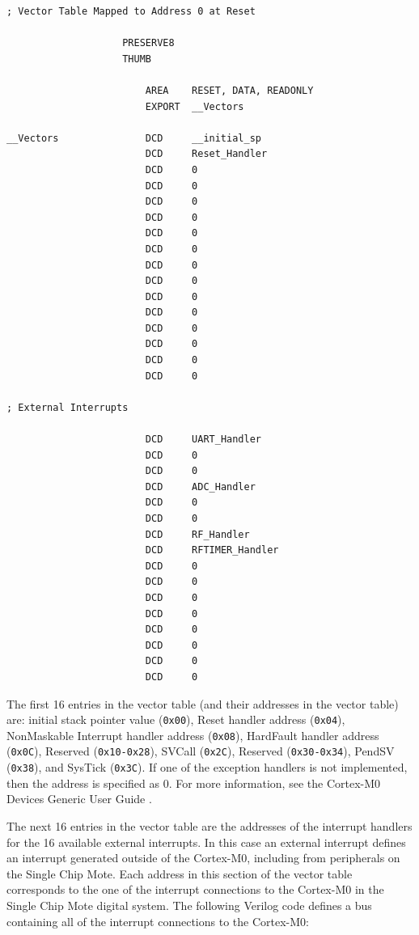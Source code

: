\begin{lstlisting}
; Vector Table Mapped to Address 0 at Reset

                    PRESERVE8
                    THUMB

                        AREA    RESET, DATA, READONLY
                        EXPORT  __Vectors

__Vectors               DCD     __initial_sp
                        DCD     Reset_Handler
                        DCD     0
                        DCD     0
                        DCD     0
                        DCD     0
                        DCD     0
                        DCD     0
                        DCD     0
                        DCD     0
                        DCD     0
                        DCD     0
                        DCD     0
                        DCD     0
                        DCD     0
                        DCD     0

; External Interrupts

                        DCD     UART_Handler
                        DCD     0
                        DCD     0
                        DCD     ADC_Handler
                        DCD     0
                        DCD     0
                        DCD     RF_Handler
                        DCD     RFTIMER_Handler
                        DCD     0
                        DCD     0
                        DCD     0
                        DCD     0
                        DCD     0
                        DCD     0
                        DCD     0
                        DCD     0
\end{lstlisting}

The first 16 entries in the vector table (and their addresses in the vector table) are: initial stack pointer value (\texttt{0x00}), Reset handler address (\texttt{0x04}), NonMaskable Interrupt handler address (\texttt{0x08}), HardFault handler address (\texttt{0x0C}), Reserved (\texttt{0x10-0x28}), SVCall (\texttt{0x2C}), Reserved (\texttt{0x30-0x34}), PendSV (\texttt{0x38}), and SysTick (\texttt{0x3C}). If one of the exception handlers is not implemented, then the address is specified as 0. For more information, see the Cortex-M0 Devices Generic User Guide \cite{cortex-m0-generic-ug}.

The next 16 entries in the vector table are the addresses of the interrupt handlers for the 16 available external interrupts. In this case an external interrupt defines an interrupt generated outside of the Cortex-M0, including from peripherals on the Single Chip Mote. Each address in this section of the vector table corresponds to the one of the interrupt connections to the Cortex-M0 in the Single Chip Mote digital system. The following Verilog code defines a bus containing all of the interrupt connections to the Cortex-M0:

